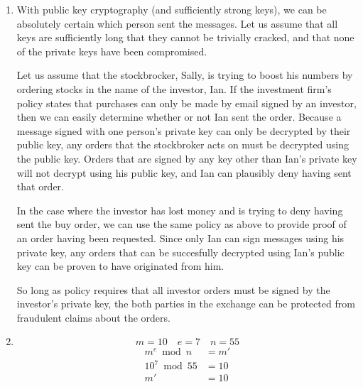 \documentclass[11pt]{article}
\begin{document}
\begin{enumerate}
\item %

With public key cryptography (and sufficiently strong keys), we can be 
absolutely certain which person sent the messages.  Let us assume that all
keys are sufficiently long that they cannot be trivially cracked, and that
none of the private keys have been compromised. 

Let us assume that the stockbrocker, Sally, is trying to boost his numbers by
ordering stocks in the name of the investor, Ian.  If the investment firm's
policy states that purchases can only be made by email signed by an investor,
then we can easily determine whether or not Ian sent the order.  Because a
message signed with one person's private key can only be decrypted by their
public key, any orders that the stockbroker acts on must be decrypted using
the public key.  Orders that are signed by any key other than Ian's private
key will not decrypt using his public key, and Ian can plausibly deny having
sent that order. 

In the case where the investor has lost money and is trying to deny having
sent the buy order, we can use the same policy as above to provide proof of an
order having been requested.  Since only Ian can sign messages using his
private key, any orders that can be succesfully decrypted using Ian's public
key can be proven to have originated from him.

So long as policy requires that all investor orders must be signed by the 
investor's private key, the both parties in the exchange can be protected from
fraudulent claims about the orders.

\item %
\[
m = 10 \quad e = 7 \quad n = 55
\]
\begin{align*}
m^e \bmod n & = m' \\
10^7 \bmod 55 & = 10 \\
m' & = 10
\end{align*}


\end{enumerate}
\end{document}
